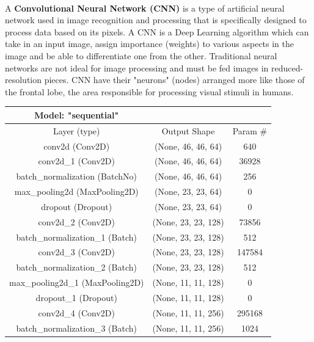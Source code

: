 \documentclass[runningheads,a4paper,11pt]{report}
\begin{document}
\paragraph{}
A \textbf{Convolutional Neural Network (CNN)} is a type of artificial neural network used in image recognition and processing that is specifically designed to process data based on its pixels. A CNN is a Deep Learning algorithm which can take in an input image, assign importance (weights) to various aspects in the image and be able to differentiate one from the other. Traditional neural networks are not ideal for image processing and must be fed images in reduced-resolution pieces. CNN have their "neurons" (nodes) arranged more like those of the frontal lobe, the area responsible for processing visual stimuli in humans.\cite{searchwhat}

\begin{center}
    \begin{longtable}{|| c c c ||} 
    \hline Model: "sequential" & & \\
    \hline
    Layer (type) & Output Shape & Param \#  \\ [2ex] 
    \hline\hline
    conv2d (Conv2D) & (None, 46, 46, 64) & 640  \\ 
    \hline
    conv2d\_1 (Conv2D) & (None, 46, 46, 64) & 36928  \\
    \hline
    batch\_normalization (BatchNo) & (None, 46, 46, 64) & 256  \\
    \hline
    max\_pooling2d (MaxPooling2D) & (None, 23, 23, 64) & 0  \\
    \hline
    dropout (Dropout) & (None, 23, 23, 64) & 0  \\
    \hline
    conv2d\_2 (Conv2D) & (None, 23, 23, 128) & 73856  \\
    \hline
    batch\_normalization\_1 (Batch) & (None, 23, 23, 128) & 512  \\
    \hline
    conv2d\_3 (Conv2D) & (None, 23, 23, 128) & 147584  \\
    \hline
    batch\_normalization\_2 (Batch) & (None, 23, 23, 128) & 512  \\
    \hline
    max\_pooling2d\_1 (MaxPooling2D) & (None, 11, 11, 128) & 0  \\
    \hline
    dropout\_1 (Dropout) & (None, 11, 11, 128) & 0  \\
    \hline
    conv2d\_4 (Conv2D) & (None, 11, 11, 256) & 295168  \\
    \hline
    batch\_normalization\_3 (Batch) & (None, 11, 11, 256) & 1024\\

\end{longtable}
\end{center}
\end{document}
